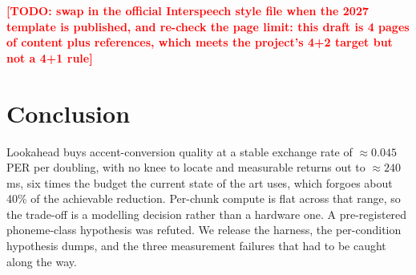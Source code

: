 \documentclass[9pt,a4paper,twocolumn]{article}
\newcommand{\todo}[1]{\textcolor{red}{\textbf{[TODO: #1]}}}
\begin{document}
\todo{swap in the official Interspeech style file when the 2027 template is
published, and re-check the page limit: this draft is 4 pages of content plus
references, which meets the project's 4+2 target but not a 4+1 rule}

\section{Conclusion}

Lookahead buys accent-conversion quality at a stable exchange rate of
${\approx}0.045$ PER per doubling, with no knee to locate and measurable
returns out to ${\approx}240$\,ms, six times the budget the current state of
the art uses, which forgoes about 40\% of the achievable reduction. Per-chunk
compute is flat across that range, so the trade-off is a modelling decision
rather than a hardware one. A pre-registered phoneme-class hypothesis was
refuted. We release the harness, the per-condition hypothesis dumps, and the
three measurement failures that had to be caught along the way.



\end{document}
